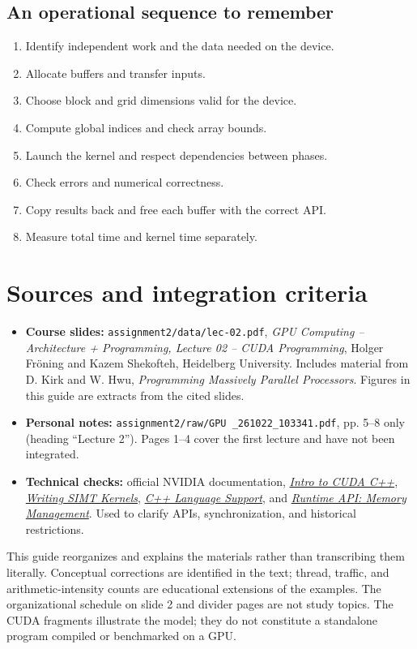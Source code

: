 \documentclass[11pt,a4paper]{article}
\let\originalsection\section
\renewcommand{\section}{\Needspace{7\baselineskip}\originalsection}
\let\originalsubsection\subsection
\renewcommand{\subsection}{\Needspace{5\baselineskip}\originalsubsection}
\begin{document}
\subsection{An operational sequence to remember}
\begin{enumerate}
\item Identify independent work and the data needed on the device.
\item Allocate buffers and transfer inputs.
\item Choose block and grid dimensions valid for the device.
\item Compute global indices and check array bounds.
\item Launch the kernel and respect dependencies between phases.
\item Check errors and numerical correctness.
\item Copy results back and free each buffer with the correct API.
\item Measure total time and kernel time separately.
\end{enumerate}

\clearpage
\section*{Sources and integration criteria}
\begin{itemize}
\item \textbf{Course slides:} \texttt{assignment2/data/lec-02.pdf},
\emph{GPU Computing -- Architecture + Programming, Lecture 02 -- CUDA
Programming}, Holger Fr{\"o}ning and Kazem Shekofteh, Heidelberg University.
Includes material from D. Kirk and W. Hwu, \emph{Programming Massively
Parallel Processors}. Figures in this guide are extracts from the cited slides.
\item \textbf{Personal notes:}
\texttt{assignment2/raw/GPU\ \_261022\_103341.pdf}, pp. 5--8 only
(heading ``Lecture 2''). Pages 1--4 cover the first lecture and have not
been integrated.
\item \textbf{Technical checks:} official NVIDIA documentation,
\href{https://docs.nvidia.com/cuda/cuda-programming-guide/02-basics/intro-to-cuda-cpp.html}{\emph{Intro to CUDA C++}},
\href{https://docs.nvidia.com/cuda/cuda-programming-guide/02-basics/writing-cuda-kernels.html}{\emph{Writing SIMT Kernels}},
\href{https://docs.nvidia.com/cuda/cuda-programming-guide/05-appendices/cpp-language-support.html}{\emph{C++ Language Support}}, and
\href{https://docs.nvidia.com/cuda/cuda-runtime-api/group__CUDART__MEMORY.html}{\emph{Runtime API: Memory Management}}.
Used to clarify APIs, synchronization, and historical restrictions.
\end{itemize}
This guide reorganizes and explains the materials rather than transcribing
them literally. Conceptual corrections are identified in the text; thread,
traffic, and arithmetic-intensity counts are educational extensions of the
examples. The organizational schedule on slide 2 and divider pages are
not study topics. The CUDA fragments illustrate the model; they do not
constitute a standalone program compiled or benchmarked on a GPU.
\end{document}

